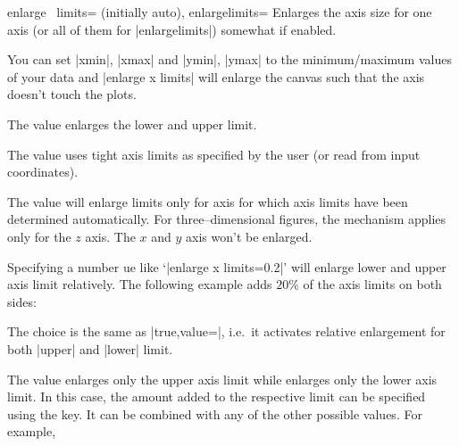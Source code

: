 \begin{pgfplotsxykeylist}{%
	enlarge \x\ limits= (initially auto),
	enlargelimits=}
Enlarges the axis size for one axis (or all of them for |enlargelimits|) somewhat if enabled.

You can set |xmin|, |xmax| and |ymin|, |ymax| to the minimum/maximum values of your data and |enlarge x limits| will enlarge the canvas such that the axis doesn't touch the plots.

	 The value  enlarges the lower and upper limit.

	 The value  uses tight axis limits as specified by the user (or read from input coordinates).

	 The value  will enlarge limits only for axis for which axis limits have been determined automatically.
	For three--dimensional figures, the  mechanism applies only for the $z$ axis. The $x$ and $y$ axis won't be enlarged.
\begin{codeexample}[]
\end{codeexample}


	 Specifying a number ue like `|enlarge x limits=0.2|' will enlarge lower and upper axis limit relatively. The following example adds $20\%$ of the axis limits on both sides:
\begin{codeexample}[]
\end{codeexample}
	\noindent The choice  is the same as |true,value=|, i.e.\ it activates relative enlargement for both |upper| and |lower| limit.

	 The value  enlarges only the upper axis limit while  enlarges only the lower axis limit. In this case, the amount added to the respective limit can be specified using the  key. It can be combined with any of the other possible values. For example,


\end{pgfplotsxykeylist}
